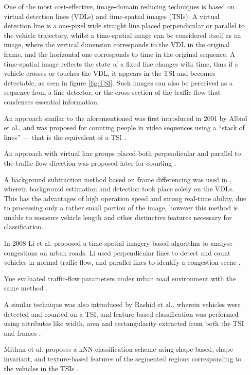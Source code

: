 One of the most cost-effective, image-domain reducing techniques is based on virtual detection lines (VDLs) and time-spatial images (TSIs).
A virtual detection line is a one-pixel wide straight line placed perpendicular or parallel to the vehicle trajectory, whilst a time-spatial image can be considered itself as an image, where the vertical dimension corresponds to the VDL in the original frame, and the horizontal one corresponds to time in the original sequence.
A time-spatial image reflects the state of a fixed line changes with time, thus if a vehicle crosses or touches the VDL, it appears in the TSI and becomes detectable, as seen in figure \ref{fig:TSI}.
Such images can also be perceived as a sequence from a line-detector, or the cross-section of the traffic flow that condenses essential information. 

An approach similar to the aforementioned was first introduced in 2001 by Albiol et al., and was proposed for counting people in video sequences using a ``stack of lines'' --- that is the equivalent of a TSI \cite{Albiol2001}.

An approach with virtual line groups placed both perpendicular and parallel to the traffic flow direction was proposed later for counting \cite{Anan2006,Wu2007}.

A background subtraction method based on frame differencing was used in \cite{Anan2006, Wu2007}, wherein background estimation and detection took place solely on the VDLs.
This has the advantages of high operation speed and strong real-time ability, due to processing only a rather small portion of the image, however this method is unable to measure vehicle length and other distinctive features necessary for classification.

In 2008 Li et al. proposed a time-spatial imagery based algorithm to analyse congestions on urban roads.
Li used perpendicular lines to detect and count vehicles in normal traffic flow, and parallel lines to identify a congestion scene \cite{Li2008}.

Yue evaluated traffic-flow parameters under urban road environment with the same method \cite{Yue2009}.

A similar technique was also introduced by Rashid et al., wherein vehicles were detected and counted on a TSI, and feature-based classification was performed using attributes like width, area and rectangularity extracted from both the TSI and frames \cite{Rashid2010}.

Mithun et al. proposes a kNN classification scheme using shape-based, shape-invariant, and texture-based features of the segmented regions corresponding to the vehicles in the TSIs \cite{Mithun2012a}.

